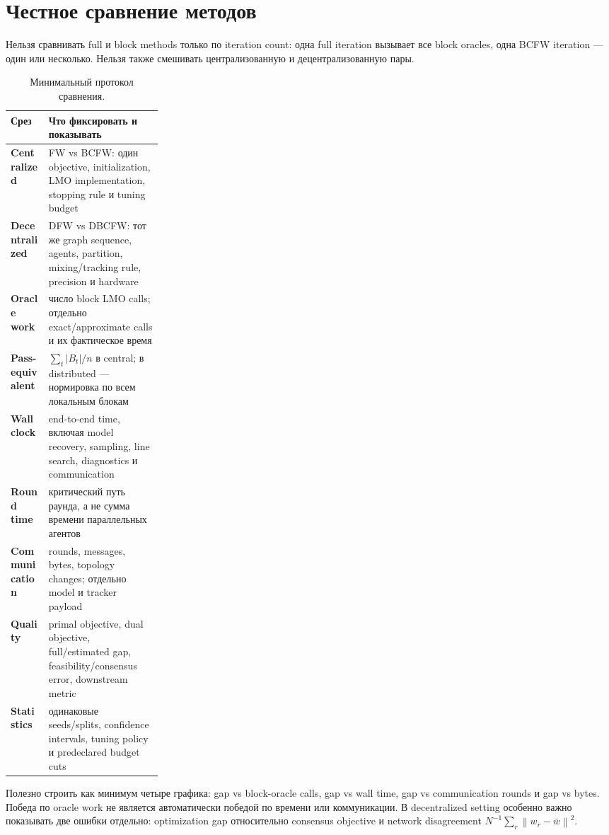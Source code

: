 \documentclass[11pt,a4paper]{article}
\newcommand{\norm}[1]{\left\lVert #1\right\rVert}
\newcommand{\method}[1]{\textsf{#1}}
\begin{document}
\section{Честное сравнение методов}

Нельзя сравнивать full и block methods только по iteration count: одна full iteration вызывает все block oracles, одна BCFW iteration --- один или несколько. Нельзя также смешивать централизованную и децентрализованную пары.

\begin{table}[H]
\centering
\small
\caption{Минимальный протокол сравнения.}
\label{tab:protocol}
\begin{tabularx}{\linewidth}{>{\bfseries}p{0.25\linewidth} X}
\toprule
Срез & Что фиксировать и показывать \\
\midrule
Centralized & \method{FW} vs \method{BCFW}: один objective, initialization, LMO implementation, stopping rule и tuning budget \\
Decentralized & \method{DFW} vs \method{DBCFW}: тот же graph sequence, agents, partition, mixing/tracking rule, precision и hardware \\
Oracle work & число block LMO calls; отдельно exact/approximate calls и их фактическое время \\
Pass-equivalent & \(\sum_t|B_t|/n\) в central; в distributed --- нормировка по всем локальным блокам \\
Wall clock & end-to-end time, включая model recovery, sampling, line search, diagnostics и communication \\
Round time & критический путь раунда, а не сумма времени параллельных агентов \\
Communication & rounds, messages, bytes, topology changes; отдельно model и tracker payload \\
Quality & primal objective, dual objective, full/estimated gap, feasibility/consensus error, downstream metric \\
Statistics & одинаковые seeds/splits, confidence intervals, tuning policy и predeclared budget cuts \\
\bottomrule
\end{tabularx}
\end{table}

Полезно строить как минимум четыре графика: gap vs block-oracle calls, gap vs wall time, gap vs communication rounds и gap vs bytes. Победа по oracle work не является автоматически победой по времени или коммуникации. В decentralized setting особенно важно показывать две ошибки отдельно: optimization gap относительно consensus objective и network disagreement \(N^{-1}\sum_r\norm{w_r-\bar w}^2\).
\end{document}
